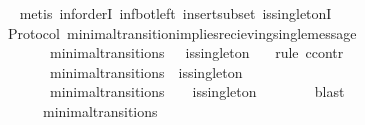 \begin{isabellebody}
%
\isadelimproof
\ \ %
\endisadelimproof
%
\isatagproof
{}\isamarkupfalse%
\ {\isacharparenleft}metis\ inf{\isachardot}orderI\ inf{\isacharunderscore}bot{\isacharunderscore}left\ insert{\isacharunderscore}subset\ is{\isacharunderscore}singletonI{\isacharprime}{\isacharparenright}%
\endisatagproof
{\isafoldproof}%
%
\isadelimproof
\isanewline
%
\endisadelimproof
\isanewline
\isanewline
{}\isamarkupfalse%
\ {\isacharparenleft}\ Protocol{\isacharparenright}\ minimal{\isacharunderscore}transition{\isacharunderscore}implies{\isacharunderscore}recieving{\isacharunderscore}single{\isacharunderscore}message\ {\isacharcolon}\isanewline
\ \ {\isachardoublequoteopen}{\isasymforall}\ {\isasymsigma}\ {\isasymsigma}{\isacharprime}{\isachardot}\ {\isacharparenleft}{\isasymsigma}{\isacharcomma}\ {\isasymsigma}{\isacharprime}{\isacharparenright}\ {\isasymin}\ minimal{\isacharunderscore}transitions\ \ {\isasymlongrightarrow}\ is{\isacharunderscore}singleton\ {\isacharparenleft}{\isasymsigma}{\isacharprime}{\isacharminus}\ {\isasymsigma}{\isacharparenright}{\isachardoublequoteclose}\isanewline
%
\isadelimproof
%
\endisadelimproof
%
\isatagproof
{}\isamarkupfalse%
\ {\isacharparenleft}rule\ ccontr{\isacharparenright}\isanewline
\ \ \isamarkupfalse%
\ {\isachardoublequoteopen}{\isasymnot}\ {\isacharparenleft}{\isasymforall}\ {\isasymsigma}\ {\isasymsigma}{\isacharprime}{\isachardot}\ {\isacharparenleft}{\isasymsigma}{\isacharcomma}\ {\isasymsigma}{\isacharprime}{\isacharparenright}\ {\isasymin}\ minimal{\isacharunderscore}transitions\ {\isasymlongrightarrow}\ is{\isacharunderscore}singleton\ {\isacharparenleft}{\isasymsigma}{\isacharprime}{\isacharminus}\ {\isasymsigma}{\isacharparenright}{\isacharparenright}{\isachardoublequoteclose}\isanewline
\ \ \isamarkupfalse%
\ \isamarkupfalse%
\ \ {\isachardoublequoteopen}{\isasymexists}\ {\isasymsigma}\ {\isasymsigma}{\isacharprime}{\isachardot}\ {\isacharparenleft}{\isasymsigma}{\isacharcomma}\ {\isasymsigma}{\isacharprime}{\isacharparenright}\ {\isasymin}\ minimal{\isacharunderscore}transitions\ {\isasymand}\ {\isasymnot}\ \ is{\isacharunderscore}singleton\ {\isacharparenleft}{\isasymsigma}{\isacharprime}{\isacharminus}\ {\isasymsigma}{\isacharparenright}{\isachardoublequoteclose}\isanewline
\ \ \ \ \isamarkupfalse%
\ blast\isanewline
\ \ \isamarkupfalse%
\ {\isachardoublequoteopen}{\isasymforall}\ {\isasymsigma}\ {\isasymsigma}{\isacharprime}{\isachardot}\ {\isacharparenleft}{\isasymsigma}{\isacharcomma}\ {\isasymsigma}{\isacharprime}{\isacharparenright}\ {\isasymin}\ minimal{\isacharunderscore}transitions\ {\isasymlongrightarrow}\isanewline

\end{isabellebody}
